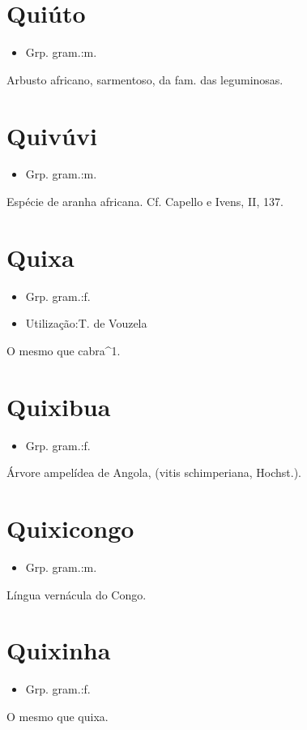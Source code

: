 \section{Quiúto}
\begin{itemize}
\item {Grp. gram.:m.}
\end{itemize}
Arbusto africano, sarmentoso, da fam. das leguminosas.
\section{Quivúvi}
\begin{itemize}
\item {Grp. gram.:m.}
\end{itemize}
Espécie de aranha africana. Cf. Capello e Ivens, II, 137.
\section{Quixa}
\begin{itemize}
\item {Grp. gram.:f.}
\end{itemize}
\begin{itemize}
\item {Utilização:T. de Vouzela}
\end{itemize}
O mesmo que \textunderscore cabra\textunderscore ^1.
\section{Quixibua}
\begin{itemize}
\item {Grp. gram.:f.}
\end{itemize}
Árvore ampelídea de Angola, (\textunderscore vitis schimperiana\textunderscore , Hochst.).
\section{Quixicongo}
\begin{itemize}
\item {Grp. gram.:m.}
\end{itemize}
Língua vernácula do Congo.
\section{Quixinha}
\begin{itemize}
\item {Grp. gram.:f.}
\end{itemize}
O mesmo que \textunderscore quixa\textunderscore .

